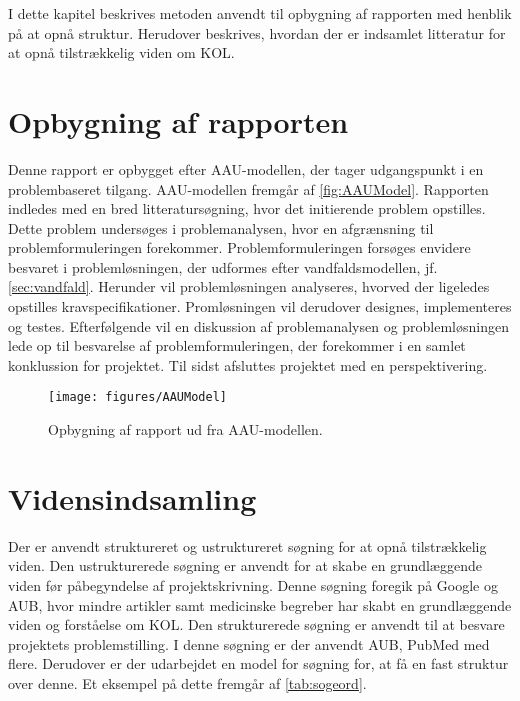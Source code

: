 I dette kapitel beskrives metoden anvendt til opbygning af rapporten med henblik på at opnå struktur. Herudover beskrives, hvordan der er indsamlet litteratur for at opnå tilstrækkelig viden om KOL.


\section{Opbygning af rapporten}
Denne rapport er opbygget efter AAU-modellen, der tager udgangspunkt i en problembaseret tilgang. AAU-modellen fremgår af \autoref{fig:AAUModel}. Rapporten indledes med en bred litteratursøgning, hvor det initierende problem opstilles. Dette problem undersøges i problemanalysen, hvor en afgrænsning til problemformuleringen forekommer. Problemformuleringen forsøges envidere besvaret i problemløsningen, der udformes efter vandfaldsmodellen, jf. \autoref{sec:vandfald}. Herunder vil problemløsningen analyseres, hvorved der ligeledes opstilles kravspecifikationer.  Promløsningen vil derudover designes, implementeres og testes. Efterfølgende vil en diskussion af problemanalysen og problemløsningen lede op til besvarelse af problemformuleringen, der forekommer i en samlet konklussion for projektet. Til sidst afsluttes projektet med en perspektivering.


\begin{figure} [H]
\centering
\texttt{[image: figures/AAUModel]}
\caption{Opbygning af rapport ud fra AAU-modellen.}
\label{fig:AAUModel}
\end{figure} 

\section{Vidensindsamling}
Der er anvendt struktureret og ustruktureret søgning for at opnå tilstrækkelig viden. Den ustrukturerede søgning er anvendt for at skabe en grundlæggende viden før påbegyndelse af projektskrivning. Denne søgning foregik på Google og AUB, hvor mindre artikler samt medicinske begreber har skabt en grundlæggende viden og forståelse om KOL. Den strukturerede søgning er anvendt til at besvare projektets problemstilling. I denne søgning er der anvendt AUB, PubMed med flere. Derudover er der udarbejdet en model for søgning for, at få en fast struktur over denne. Et eksempel på dette fremgår af \autoref{tab:sogeord}.

